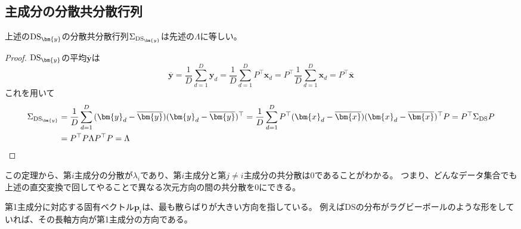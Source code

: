         \subsection{主成分の分散共分散行列}
            \begin{shadebox}
                上述の$\DS_{\bm{y}}$の分散共分散行列$\Sigma_{\DS_{\bm{y}}}$は先述の$\Lambda$に等しい。
            \end{shadebox}
            \begin{proof}
                \quad\par
                $\DS_{\bm{y}}$の平均$\overline{\bm{y}}$は
                \[\overline{\bm{y}} = \frac{1}{D}\sum_{d=1}^D{\bm{y}_d} = \frac{1}{D}\sum_{d=1}^D{P^\top\bm{x}_d} = P^\top\frac{1}{D}\sum_{d=1}^D{\bm{x}_d} = P^\top\overline{\bm{x}}\]
                これを用いて
                \begin{align*}
                    \Sigma_{\DS_{\bm{y}}} &= \frac{1}{D}\sum_{d=1}^D{(\bm{y}_d-\overline{\bm{y}})(\bm{y}_d-\overline{\bm{y}})^\top} = \frac{1}{D}\sum_{d=1}^D{P^\top(\bm{x}_d-\overline{\bm{x}})(\bm{x}_d-\overline{\bm{x}})^\top P} = P^\top\Sigma_\DS P \\
                    &= P^\top P\Lambda P^\top P = \Lambda
                \end{align*}
            \end{proof}
        この定理から、第$i$主成分の分散が$\lambda_i$であり、第$i$主成分と第$j\neq i$主成分の共分散は0であることがわかる。
        つまり、どんなデータ集合でも上述の直交変換で回してやることで異なる次元方向の間の共分散を0にできる。
        \par
        第1主成分に対応する固有ベクトル$\bm{p}_i$は、最も散らばりが大きい方向を指している。
        例えばDSの分布がラグビーボールのような形をしていれば、その長軸方向が第1主成分の方向である。